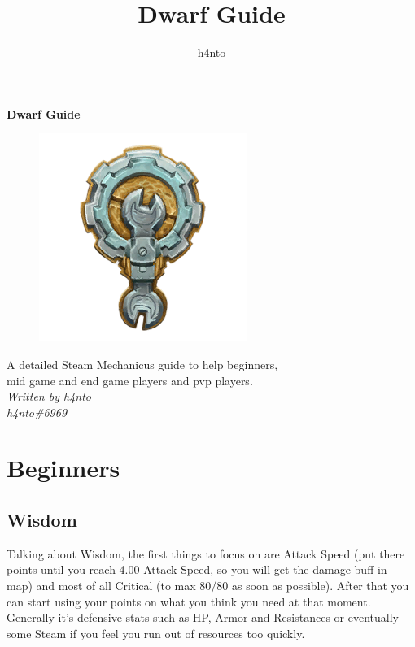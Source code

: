 \documentclass[12pt]{article}
\title{Dwarf Guide}
\author{h4nto}
\begin{document}

\begin{center}
    \vspace*{\fill}
    \Huge\textbf{Dwarf Guide} \\
    \begin{figure}[h]
        \includegraphics{dwarf.png}
        \centering
    \end{figure}
    \vspace*{\fill}
    \normalsize{A detailed Steam Mechanicus guide to help beginners,\\mid game and end game players and pvp players.} \\
    \vspace*{\fill}
    \Large\textsl{Written by h4nto} \\
    \Large\textsl{h4nto\#6969}
    \vspace*{\fill}
\end{center}

\newpage


\tableofcontents

\newpage

\section{Beginners}

\subsection{Wisdom}
Talking about Wisdom, the first things to focus on are Attack Speed (put there points until you reach 4.00 Attack Speed, so you will get the damage buff in map) and most of all Critical (to max 80/80 as soon as possible).
After that you can start using your points on what you think you need at that moment.
Generally it's defensive stats such as HP, Armor and Resistances or eventually some Steam if you feel you run out of resources too quickly.
\end{document}

